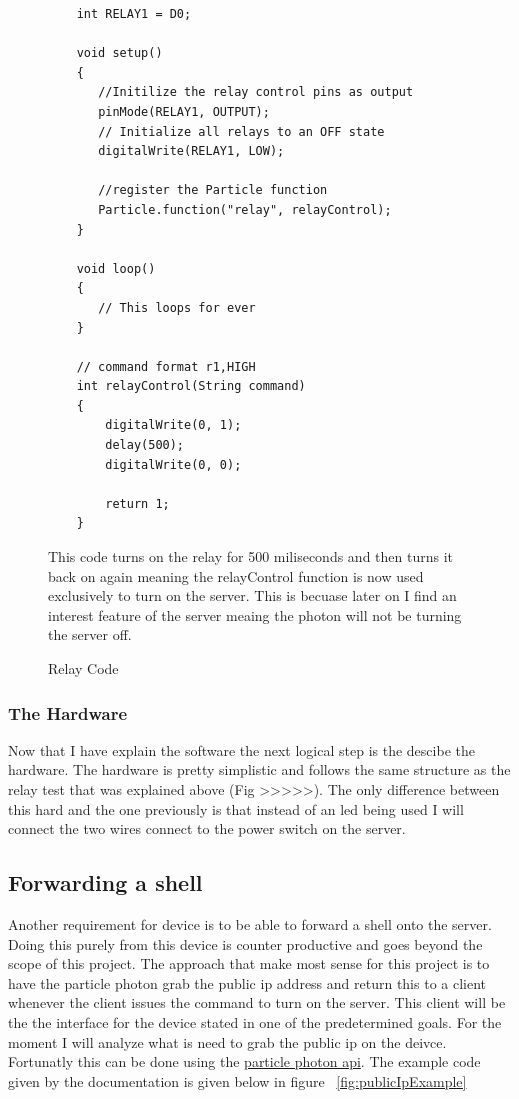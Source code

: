 \documentclass{article}
\begin{document}
\begin{figure}
    \begin{lstlisting}
    int RELAY1 = D0;

    void setup()
    {
       //Initilize the relay control pins as output
       pinMode(RELAY1, OUTPUT);
       // Initialize all relays to an OFF state
       digitalWrite(RELAY1, LOW);

       //register the Particle function
       Particle.function("relay", relayControl);
    }

    void loop()
    {
       // This loops for ever
    }

    // command format r1,HIGH
    int relayControl(String command)
    {
        digitalWrite(0, 1);
        delay(500);
        digitalWrite(0, 0);

        return 1;
    }
    \end{lstlisting}
    \caption{Relay Code} \label{fig:relayCode}
    \vspace{0.5cm}
    This code turns on the relay for 500 miliseconds and then turns it back on again
    meaning the relayControl function is now used exclusively to turn on the server.
    This is becuase later on I find an interest feature of the server meaing the photon
    will not be turning the server off.

\end{figure}

\subsubsection{The Hardware}
Now that I have explain the software the next logical step is the descibe the hardware. The
hardware is pretty simplistic and follows the same structure as the relay test that was
explained above (Fig >>>>>). The only difference between this hard and the one previously
is that instead of an led being used I will connect the two wires connect to the power
switch on the server.


\subsection{Forwarding a shell}
Another requirement for device is to be able to forward a shell onto the server. Doing this
purely from this device is counter productive and goes beyond the scope of this project. The
approach that make most sense for this project is to have the particle photon grab the public
ip address and return this to a client whenever the client issues the command to turn on the
server. This client will be the the interface for the device stated in one of the predetermined
goals. For the moment I will analyze what is need to grab the public ip on the deivce. Fortunatly
this can be done using the \href{https://docs.particle.io/reference/firmware/photon/#get-public-ip}
{particle photon api}. The example code given by the documentation is given below in figure
~\ref{fig:publicIpExample}
\end{document}
